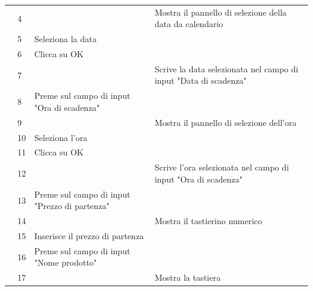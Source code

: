 \begin{longtable}{|C{3.0cm}|C{1.3cm}|L{5.2cm}|L{5.2cm}|}
                        & 4
                        & 
                        & Mostra il pannello di selezione della data da calendario\\
                        & 5
                        & Seleziona la data
                        & \\
                        & 6
                        & Clicca su OK
                        & \\
                        & 7
                        & 
                        & Scrive la data selezionata nel campo di input "Data di scadenza"\\
                        & 8
                        & Preme sul campo di input "Ora di scadenza"
                        & \\
                        & 9
                        & 
                        & Mostra il pannello di selezione dell'ora\\
                        & 10
                        & Seleziona l'ora
                        & \\
                        & 11
                        & Clicca su OK
                        & \\
                        & 12
                        & 
                        & Scrive l'ora selezionata nel campo di input "Ora di scadenza"\\
                        & 13
                        & Preme sul campo di input "Prezzo di partenza"
                        & \\
                        & 14
                        &
                        & Mostra il tastierino numerico \\
                        & 15
                        & Inserisce il prezzo di partenza
                        & \\
                        & 16
                        & Preme sul campo di input "Nome prodotto"
                        & \\
                        & 17
                        &
                        & Mostra la tastiera \\

\end{longtable}
